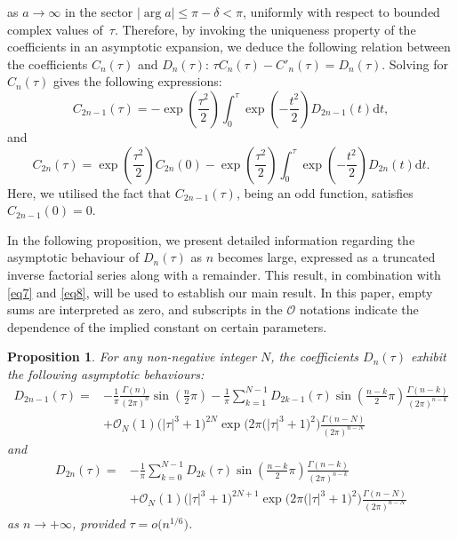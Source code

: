 \documentclass[pdftex]{sigma}
\def\d{\mathrm{d}}
\numberwithin{equation}{section}
\newtheorem{Proposition}[Theorem]{Proposition}
 { \theoremstyle{definition}
\newtheorem{Definition}[Theorem]{Definition}
\newtheorem{Note}[Theorem]{Note}
\newtheorem{Example}[Theorem]{Example}
\newtheorem{Remark}[Theorem]{Remark} }
\begin{document}
as $a\to \infty$ in the sector $|\arg a| \le \pi-\delta<\pi$, uniformly with respect to bounded complex values of~$\tau$. Therefore, by invoking the uniqueness property of the coefficients in an asymptotic expansion, we deduce the following relation between the coefficients $C_n(\tau)$ and $D_n(\tau)$: $\tau C_n (\tau ) - C'_n (\tau ) = D_n (\tau )$. Solving for $C_n(\tau)$ gives the following expressions:
\begin{equation}\label{eq7}
C_{2n-1} (\tau ) = -\exp \left(\frac{\tau^2}{2} \right)\int_0^\tau \exp \left(- \frac{t^2 }{2}\right)D_{2n-1} (t)\d t,
\end{equation}
and
\begin{equation}\label{eq8}
C_{2n} (\tau ) = \exp \left(\frac{\tau^2}{2}\right) C_{2n} (0) - \exp \left( \frac{\tau^2}{2}\right)\int_0^\tau \exp \left(-\frac{t^2}{2}\right)D_{2n} (t)\d t.
\end{equation}
Here, we utilised the fact that $C_{2n-1} (\tau )$, being an odd function, satisfies $C_{2n-1} (0)=0$.

In the following proposition, we present detailed information regarding the asymptotic behaviour of $D_n(\tau)$ as $n$ becomes large, expressed as a truncated inverse factorial series along with a remainder. This result, in combination with \eqref{eq7} and \eqref{eq8}, will be used to establish our main result. In this paper, empty sums are interpreted as zero, and subscripts in the $\mathcal{O}$ notations indicate the dependence of the implied constant on certain parameters.

\begin{Proposition}\label{prop1} For any non-negative integer $N$, the coefficients $D_n(\tau)$ exhibit the following asymptotic behaviours:
\begin{align}
D_{2n - 1} (\tau ) ={}& -\frac{1}{\pi}\frac{\Gamma (n)}{(2\pi )^n } \sin \left( \frac{n}{2}\pi \right) -\frac{1}{\pi}\sum_{k = 1}^{N - 1} D_{2k - 1} (\tau )\sin \left( \frac{n - k}{2}\pi \right)\frac{\Gamma (n - k)}{(2\pi )^{n - k}}\nonumber \\ & +\mathcal{O}_N (1)\bigl(\left| \tau \right|^3 + 1\bigr)^{2N} \exp \big( 2\pi \bigl(\left| \tau \right|^3 + 1\bigr)^2 \big)\frac{\Gamma (n - N)}{(2\pi )^{n - N}}\label{eq10}
\end{align}
and
\begin{align}
D_{2n} (\tau ) ={}& -\frac{1}{\pi}\sum_{k = 0}^{N - 1} D_{2k} (\tau )\sin \left( \frac{n - k}{2}\pi \right)\frac{\Gamma (n - k)}{(2\pi )^{n - k}} \nonumber\\ & +\mathcal{O}_N (1)\bigl(\left| \tau \right|^3 + 1\bigr)^{2N+1} \exp \big( 2\pi \bigl(\left| \tau \right|^3 + 1\bigr)^2 \big)\frac{\Gamma (n - N)}{(2\pi )^{n - N}}\label{eq11}
\end{align}
as $n\to+\infty$, provided $\tau = o\big(n^{1/6}\big)$.
\end{Proposition}
\end{document}
